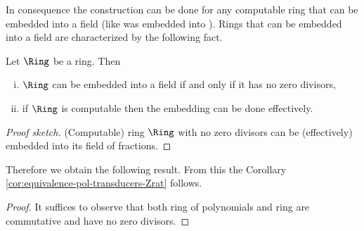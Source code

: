 In consequence the construction can be done for any computable ring that can be embedded into a field
(like \Z was embedded into \Q). Rings that can be embedded into a field are characterized by the following fact.
\begin{lemma}\label{lem:ring-with-no-zero-divisors-subring-of-a-field}
	Let $\Ring$ be a ring. Then
	\begin{enumerate}[(i)]
		\item $\Ring$ can be embedded into a field if and only if it has no zero divisors,
		\item if $\Ring$ is computable then the embedding can be done effectively.
	\end{enumerate}
\end{lemma}
\begin{proof}[Proof sketch]
	(Computable) ring $\Ring$ with no zero divisors can be (effectively) embedded into its field of fractions.
\end{proof}
Therefore we obtain the following result.
From this the Corollary \ref{cor:equivalence-pol-transducers-Zrat} follows.
\corEquivPolTransducersZrat*
\begin{proof}%
It suffices to observe that both ring of polynomials and ring \Zrat are commutative and have no zero divisors.
\end{proof}
